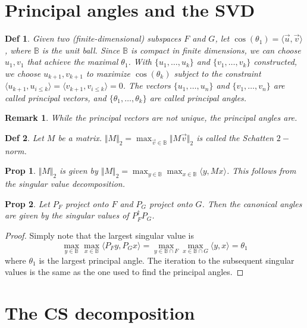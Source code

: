 \documentclass[11pt]{article}
\newtheorem{defn}{Def}
\newtheorem{rmk}{Remark}
\newtheorem{prop}{Prop}
\begin{document}
\section{Principal angles and the SVD}
\begin{defn}
    Given two (finite-dimensional) subspaces $F$ and $G$, let $\cos(\theta_1) = \langle \vec u, \vec v\rangle$, where $\mathbb B$ is the unit ball. Since $\mathbb B$ is compact in finite dimensions, we can choose $u_1, v_1$ that achieve the maximal $\theta_1$. With $\{u_1, \dots, u_k\}$ and $\{v_1, \dots, v_k\}$ constructed, we choose $u_{k+1}, v_{k+1}$ to maximize $\cos(\theta_k)$ subject to the constraint $\langle u_{k+1}, u_{i \leq k}\rangle = \langle v_{k+1}, v_{i \leq k}\rangle = 0$. The vectors $\{u_1, \dots, u_n\}$ and $\{v_1, \dots, v_n\}$ are called principal vectors, and $\{\theta_1, \dots, \theta_k\}$ are called principal angles.
\end{defn}
\begin{rmk}
While the principal vectors are not unique, the principal angles are.
\end{rmk}
\begin{defn}
    Let $M$ be a matrix. $\Vert M \Vert_2 = \max_{\vec v \in \mathbb B}\Vert M \vec v \Vert_2$ is called the Schatten $2-$norm.
\end{defn}
\begin{prop}
$\Vert M \Vert_2$ is given by $\Vert M \Vert_2 = \max_{y \in \mathbb B}\max_{x \in \mathbb B}\langle y, Mx\rangle$. This follows from the singular value decomposition.
\end{prop}
\begin{prop}
Let $P_F$ project onto $F$ and $P_G$ project onto $G$. Then the canonical angles are given by the singular values of $P_F^\dagger P_G$. 
\end{prop}
\begin{proof}
    Simply note that the largest singular value is 
    $$\max_{y \in \mathbb B}\max_{x \in \mathbb B}\langle P_F y, P_G x\rangle = \max_{y \in \mathbb B \cap F}\max_{x \in \mathbb B \cap G} \langle y,x\rangle = \theta_1$$
    where $\theta_1$ is the largest principal angle. The iteration to the subsequent singular values is the same as the one used to find the principal angles.
\end{proof}

\section{The CS decomposition}
\end{document}
